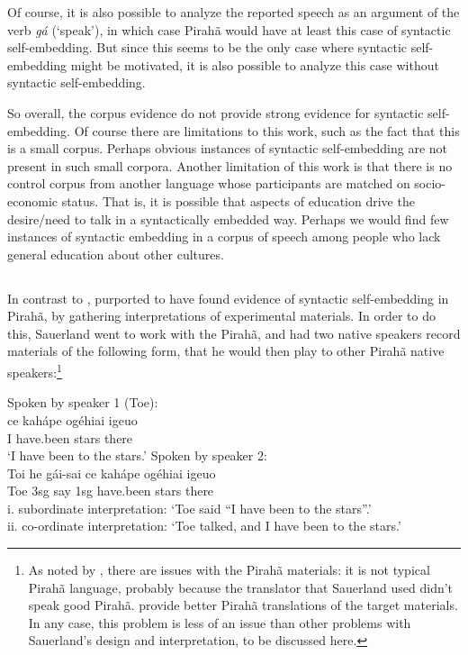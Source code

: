 \documentclass[output=paper]{langscibook}
\begin{document}
Of course, it is also possible to analyze the reported speech as an argument of the verb \textit{gá} (`speak'), in which case Pirahã would have at least this case of syntactic self-embedding.  But since this seems to be the only case where syntactic self-embedding might be motivated, it is also possible to analyze this case without syntactic self-embedding.

So overall, the corpus evidence do not provide strong evidence for syntactic self-embedding. Of course there are limitations to this work, such as the fact that this is a small corpus.  Perhaps obvious instances of syntactic self-embedding are not present in such small corpora.  Another limitation of this work is that there is no control corpus from another language whose participants are matched on socio-economic status.  That is, it is possible that aspects of education drive the desire\slash need to talk in a syntactically embedded way.  Perhaps we would find few instances of syntactic embedding in a corpus of speech among people who lack general education about other cultures.

\subsection{}
\label{sauerland_sec}

In contrast to \citet{futrell2016corpus}, \citet{sauerland2018false} purported to have found evidence of syntactic self-embedding in Pirahã, by gathering interpretations of experimental materials. In order to do this, Sauerland went to work with the Pirahã, and had two native speakers record materials of the following form, that he would then play to other Pirahã native speakers:\footnote{As noted by \citet{everett2019recursion}, there are issues with the Pirahã materials: it is not typical Pirahã language, probably because the translator that Sauerland used didn't speak good Pirahã. \citet{everett2019recursion} provide better Pirahã translations of the target materials. In any case, this problem is less of an issue than other problems with Sauerland's design and interpretation, to be discussed here.}

\eal
\label{sauerland_ex}
\ex \label{sauerland_ex1} Spoken by speaker 1 (Toe):\\
\gll ce kahápe ogéhiai igeuo \\ 
     I have.been stars there\\
\glt `I have been to the stars.'
\ex \label{sauerland_ex2} Spoken by speaker 2:\\
\gll  Toi he gái-sai ce kahápe ogéhiai igeuo \\
      Toe 3sg say 1sg have.been stars there\\
\glt i. subordinate interpretation: `Toe said ``I have been to the stars''.'\\
     ii. co-ordinate interpretation: `Toe talked, and I have been to the stars.'
\zl
\end{document}
